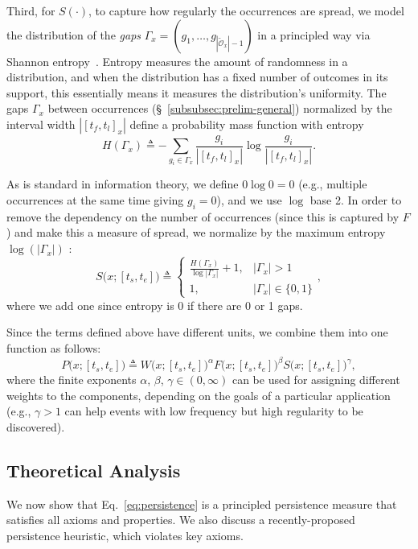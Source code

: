 \documentclass[sigconf]{acmart}
\newcommand{\pattern}{x}
\newcommand{\x}{x}
\newcommand{\intervalStart}{t_s}
\newcommand{\intervalEnd}{t_e}
\newcommand{\interval}{[\intervalStart, \intervalEnd]}
\newcommand{\occs}{\mathcal{O}}
\newcommand{\uniqueOccs}{\tilde{\occs}}
\newcommand{\firstOcc}{t_f}
\newcommand{\lastOcc}{t_l}
\newcommand{\occInterval}{[\firstOcc,\lastOcc]}
\newcommand{\occIntervalWidth}{|\occInterval_\x|}
\newcommand{\freq}{F}
\newcommand{\freqLong}{\freq\big(x;\interval\big)}
\newcommand{\width}{W}
\newcommand{\widthLong}{\width\big(\pattern; \interval\big)}
\newcommand{\spread}{S}
\newcommand{\spreadLong}{\spread\big(\pattern; \interval\big)}
\newcommand{\entropy}{H}
\newcommand{\persistence}{P}
\newcommand{\gaps}{\Gamma}
\newcommand{\gap}{g}
\newcommand{\wExp}{\alpha}
\newcommand{\fExp}{\beta}
\newcommand{\sExp}{\gamma}
\begin{document}
Third, for $\spread(\cdot)$, to capture how regularly the occurrences are spread, we model the distribution of the \textit{gaps} $\gaps_x = (\gap_1, \dots, \gap_{|\uniqueOccs_\x| - 1})$ in a principled way via Shannon entropy~\cite{cover2012elements}. 
Entropy measures the amount of randomness in a distribution, and when the distribution has a fixed number of outcomes in its support, this essentially means it measures the distribution's uniformity.
The gaps $\gaps_\x$ between occurrences (\S~\ref{subsubsec:prelim-general}) normalized by the interval width $|\occInterval_\x|$ define a probability mass function with entropy 
\begin{equation}
    \label{eq:entropy}
    \entropy(\gaps_\x) \triangleq - \textstyle \sum_{\gap_i \in \gaps_x} \frac{\gap_i}{\occIntervalWidth}\log\frac{\gap_i}{\occIntervalWidth}.
\end{equation}

As is standard in information theory, we define $0 \log 0 = 0$ (e.g., multiple occurrences at the same time giving $\gap_i = 0$), and we use $\log$ base 2. In order to remove the dependency on the number of occurrences (since this is captured by $\freq$) and make this a measure of spread, we normalize by the maximum entropy $\log(|\gaps_\x|)$ \cite{cover2012elements}: 
\begin{equation}
    \label{eq:spread}
    \spreadLong \triangleq
    \begin{cases}
        \frac{\entropy(\gaps_\x)}{\log |\gaps_\x|} + 1, & |\gaps_\x| > 1 \\
        1, & |\gaps_\x| \in \{0, 1\}
    \end{cases},
\end{equation}
where we add one since entropy is 0 if there are 0 or 1 gaps.

Since the terms defined above have different units, we combine them into one function as follows:  
\begin{equation}
    \label{eq:persistence}
    \persistence\big(\pattern; \interval\big) \triangleq \widthLong^\wExp \freqLong^\fExp \spreadLong^\sExp,
\end{equation}
where the finite exponents $\wExp$, $\fExp$, $\sExp \in (0,\infty)$
can be used for assigning 
different weights to the components, depending on the goals of a particular application (e.g., $\sExp > 1$ can help events with low frequency but high regularity to be discovered). 

\subsection{Theoretical Analysis}
\label{subsec:measure-theory}
\noindent We now show that Eq.~\eqref{eq:persistence} is a principled persistence measure that satisfies all axioms and properties. 
We also discuss a recently-proposed persistence heuristic, which violates key axioms. 
\end{document}
